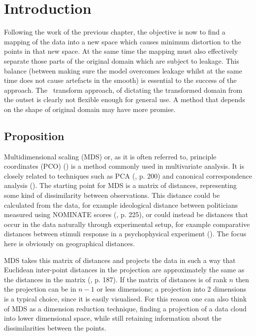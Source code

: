 \label{chap-mds}
\section{Introduction}

Following the work of the previous chapter, the objective is now to find a mapping of the data into a new space which causes minimum distortion to the points in that new space. At the same time the mapping must also effectively separate those parts of the original domain which are subject to leakage. This balance (between making sure the model overcomes leakage whilst at the same time does not cause artefacts in the smooth) is essential to the success of the approach. The \sch\ transform approach, of dictating the transformed domain from the outset is clearly not flexible enough for general use. A method that depends on the shape of original domain may have more promise.

\subsection{Proposition}

Multidimensional scaling (MDS) or, as it is often referred to, principle coordinates (PCO) (\cite{gower1966}) is a method commonly used in multivariate analysis. It is closely related to techniques such as PCA (\cite{chatfieldcollins}, p. 200) and canonical correspondence analysis (\cite{terbraak}). The starting point for MDS is a matrix of distances, representing some kind of dissimilarity between observations. This distance could be calculated from the data, for example ideological distance between politicians measured using NOMINATE scores (\cite{quantss}, p. 225), or could instead be distances that occur in the data naturally through experimental setup,  for example comparative distances between stimuli response in a psychophysical experiment (\cite{torgerson}). The focus here is obviously on geographical distances.

MDS takes this matrix of distances and projects the data in such a way that Euclidean inter-point distances in the projection are approximately the same as the distances in the matrix (\cite{chatfieldcollins}, p. 187). If the matrix of distances is of rank $n$ then the projection can be in $n-1$ or less dimensions; a projection into 2 dimensions is a typical choice, since it is easily visualised. For this reason one can also think of MDS as a dimension reduction technique, finding a projection of a data cloud into lower dimensional space, while still retaining information about the dissimilarities between the points.

